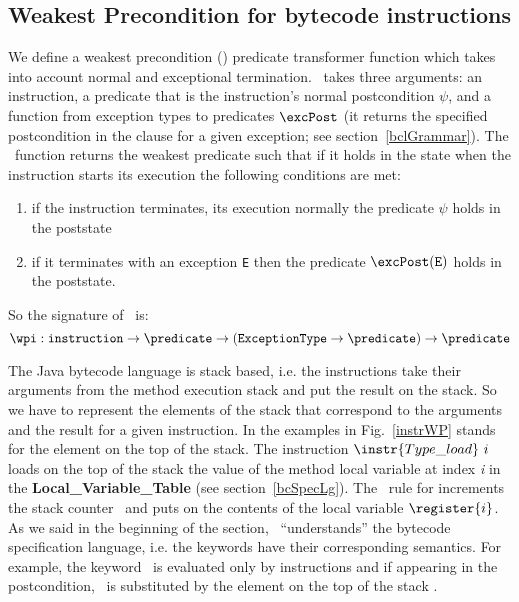 \subsection{Weakest Precondition for bytecode instructions}\label{wpInstr}
We define a weakest precondition (\wpi) predicate transformer function which takes into account normal and exceptional termination. 
\wpi \ takes three arguments: an instruction, a predicate that is the instruction's normal postcondition $\psi$, and a function
from exception types to predicates $\excPost$ (it returns the specified postcondition in the  clause for a given exception; see section~\ref{bclGrammar}).
The \wpi \ function returns the weakest predicate such that if it holds in the state when the instruction starts its execution the following conditions are met: 
\begin{enumerate}
	\item if the instruction terminates, its execution normally the predicate $\psi$ holds in the poststate 
	\item if it terminates with an exception \texttt{E} then the predicate $\excPost(\tt{E})$ holds in the poststate.
\end{enumerate}
 So the signature of \wpi \ is:
$$\wpi : \texttt{instruction} \rightarrow \predicate \rightarrow (\tt{ ExceptionType} \rightarrow  \predicate) \rightarrow \predicate   $$

 The Java bytecode language is stack based, i.e. the instructions take their arguments from the method execution stack and 
 put the result on the stack. So we have to represent the elements of the stack that correspond to the arguments and the result for a given instruction. 
 In the examples in Fig.~\ref{instrWP} \stack{\counter} stands for the element on the top of the stack. 
 The instruction $\instr{Type\_load} \ i$  loads on the top of the stack the value of the method local variable at index \textit{i}
 in the \textbf{Local\_Variable\_Table} (see section~\ref{bcSpecLg}). The \wpi \ rule for   increments the stack
counter \counter \ and puts on \stack{\counter} the contents of the local variable $\register{i}$.
As we said in the beginning of the section, \wpi \ ``understands'' the bytecode specification language, i.e. the keywords have their 
corresponding semantics. For example, the keyword \result \ is evaluated only by  
instructions and if appearing in the postcondition, \result \ is substituted by the element on the top of 
the stack \stack{\counter}. 

